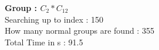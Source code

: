 \textbf{Group : $C_2*C_{12}$}\\
Searching up to index : 150\\
How many normal groups are found : 355\\
Total Time in s : 91.5\\
